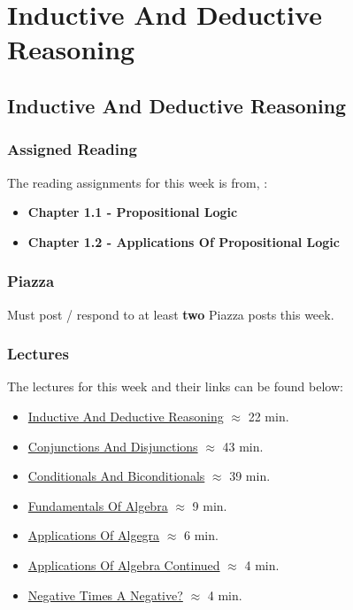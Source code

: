 \clearpage

\newcommand{\ChapTitle}{Inductive And Deductive Reasoning}
\newcommand{\SectionTitle}{Inductive And Deductive Reasoning}

\chapter{\ChapTitle}
\section{\SectionTitle}

\subsection{Assigned Reading}

The reading assignments for this week is from, \Textbook:

\begin{itemize}
    \item \textbf{Chapter 1.1 - Propositional Logic}
    \item \textbf{Chapter 1.2 - Applications Of Propositional Logic}
\end{itemize}

\subsection{Piazza}

Must post / respond to at least \textbf{two} Piazza posts this week.

\subsection{Lectures}

The lectures for this week and their links can be found below:

\begin{itemize}
    \item \href{https://drive.explaineverything.com/thecode/GYWSZFB}{Inductive And Deductive Reasoning} $\approx$ 22 min.
    \item \href{https://applied.cs.colorado.edu/mod/hvp/view.php?id=51549}{Conjunctions And Disjunctions} $\approx$ 43 min.
    \item \href{https://applied.cs.colorado.edu/mod/hvp/view.php?id=51550}{Conditionals And Biconditionals} $\approx$ 39 min.
    \item \href{https://applied.cs.colorado.edu/mod/hvp/view.php?id=51552}{Fundamentals Of Algebra} $\approx$ 9 min.
    \item \href{https://applied.cs.colorado.edu/mod/hvp/view.php?id=51553}{Applications Of Algegra} $\approx$ 6 min.
    \item \href{https://applied.cs.colorado.edu/mod/hvp/view.php?id=51554}{Applications Of Algebra Continued} $\approx$ 4 min.
    \item \href{https://applied.cs.colorado.edu/mod/hvp/view.php?id=51555}{Negative Times A Negative?} $\approx$ 4 min.
\end{itemize}

